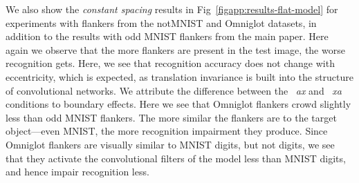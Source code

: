 \documentclass{article}
\begin{document}
We also show the \emph{constant spacing} results in Fig~\ref{figapp:results-flat-model} for experiments with flankers from the notMNIST and Omniglot datasets, in addition to the results with odd MNIST flankers from the main paper. Here again we observe that the more flankers are present in the test image, the worse recognition gets.  Here, we see that recognition accuracy does not change with eccentricity, which is expected, as translation invariance is built into the structure of convolutional networks.  We attribute the difference between the ~\emph{ax} and ~\emph{xa} conditions to boundary effects.  Here we see that Omniglot flankers crowd slightly less than odd MNIST flankers. The more similar the flankers are to the target object---even MNIST, the more recognition impairment they produce.  Since Omniglot flankers are visually similar to MNIST digits, but not digits, we see that they activate the convolutional filters of the model less than MNIST digits, and hence impair recognition less.
\end{document}
